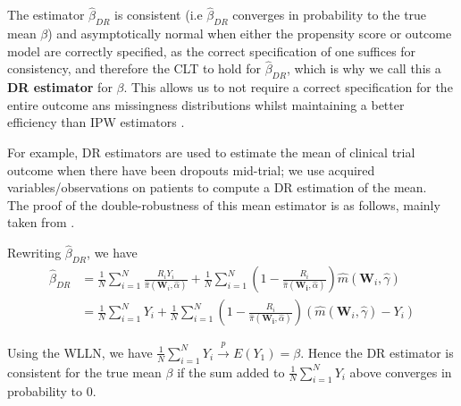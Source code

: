 \documentclass[12pt,twoside]{article}
\begin{document}
The estimator $\hat\beta_{DR}$ is consistent (i.e $\hat\beta_{DR}$ converges in probability to the true mean $\beta$) and asymptotically normal when either the propensity score or outcome model are correctly specified, as the correct specification of one suffices for consistency, and therefore the CLT to hold for $\hat\beta_{DR}$, which is why we call this a \textbf{DR estimator} for $\beta$. This allows us to not require a correct specification for the entire outcome ans missingness distributions whilst maintaining a better efficiency than IPW estimators \citep{bangrobins,vansteelandt}.

For example, DR estimators are used to estimate the mean of clinical trial outcome when there have been dropouts mid-trial; we use acquired variables/observations on patients to compute a DR estimation of the mean. \\

The proof of the double-robustness of this mean estimator is as follows, mainly taken from \citet{vansteelandt}.

Rewriting $\hat{\beta}_{DR}$, we have
\begin{align*}
    \hat{\beta}_{DR} & = \frac{1}{N}\sum_{i=1}^{N}\frac{R_iY_i}{\hat\pi(\mathbf{W}_i, \hat{\alpha})} + \frac{1}{N}\sum_{i=1}^{N} \left(1 - \frac{R_i}{\hat\pi(\mathbf{W_i},\hat{\alpha})} \right) \hat m(\mathbf{W}_i, \hat\gamma) \\
    & = \frac{1}{N}\sum_{i=1}^{N} Y_i + \frac{1}{N}\sum_{i=1}^{N}\left(1 - \frac{R_i}{\hat\pi(\mathbf{W_i},\hat{\alpha})} \right) (\hat m(\mathbf{W}_i, \hat\gamma)-Y_i)
\end{align*}

Using the WLLN, we have $\frac{1}{N}\sum_{i=1}^{N} Y_i\xrightarrow{p} E(Y_1) = \beta$. Hence the DR estimator is consistent for the true mean $\beta$ if the sum added to $\frac{1}{N}\sum_{i=1}^{N} Y_i$ above converges in probability to 0. \\
\end{document}
